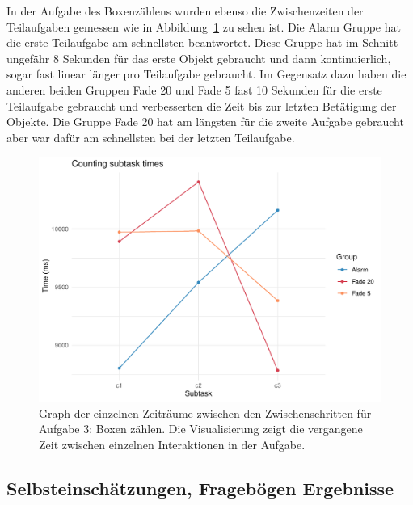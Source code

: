 In der Aufgabe des Boxenzählens wurden ebenso die Zwischenzeiten der Teilaufgaben gemessen wie in Abbildung~\ref{fig:timeTask3} zu sehen ist. Die Alarm Gruppe hat die erste Teilaufgabe am schnellsten beantwortet. Diese Gruppe hat im Schnitt ungefähr 8 Sekunden für das erste Objekt gebraucht und dann kontinuierlich, sogar fast linear länger pro Teilaufgabe gebraucht. Im Gegensatz dazu haben die anderen beiden Gruppen Fade 20 und Fade 5 fast 10 Sekunden für die erste Teilaufgabe gebraucht und verbesserten die Zeit bis zur letzten Betätigung der Objekte. Die Gruppe Fade 20 hat am längsten für die zweite Aufgabe gebraucht aber war dafür am schnellsten bei der letzten Teilaufgabe.

\begin{figure}[H]
	\centering
	\includegraphics[width=\textwidth]{./_StudyResults/timeTask3}
	\caption{Graph der einzelnen Zeiträume zwischen den Zwischenschritten für Aufgabe 3: Boxen zählen. Die Visualisierung zeigt die vergangene Zeit zwischen einzelnen Interaktionen in der Aufgabe.}
	\label{fig:timeTask3}
\end{figure}


\subsection{Selbsteinschätzungen, Fragebögen Ergebnisse}

